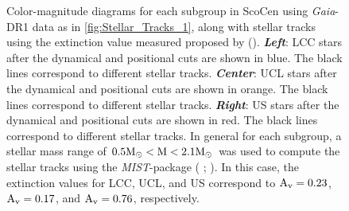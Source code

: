 \begin{figure}[!ht]
\centering
\caption{\scriptsize{Color-magnitude diagrams for each subgroup in ScoCen using \textit{Gaia}-DR1 data as in \autoref{fig:Stellar_Tracks_1}, along with stellar tracks using the extinction value measured proposed by  (\citeyear{1989A&A...216...44D}). \textit{\textbf{Left}}: LCC stars after the dynamical and positional cuts are shown in blue. The black lines correspond to different stellar tracks. \textit{\textbf{Center}}: UCL stars after the dynamical and positional cuts are shown in orange. The black lines correspond to different stellar tracks. \textit{\textbf{Right}}: US stars after the dynamical and positional cuts are shown in red. The black lines correspond to different stellar tracks. In general for each subgroup, a stellar mass range of $0.5 \textnormal{M}_\odot < \textnormal{M} < 2.1 \textnormal{M}_\odot$ was used to compute the stellar tracks using the \textit{MIST}-package ( \citeyear{2016ApJS..222....8D};  \citeyear{2016ApJ...823..102C}). In this case, the extinction values for LCC, UCL, and US correspond to $\textnormal{A}_\textnormal{v} = 0.23$, $\textnormal{A}_\textnormal{v} = 0.17$, and $\textnormal{A}_\textnormal{v} = 0.76$, respectively.}}
\label{fig:Stellar_Tracks_3}
\end{figure}

